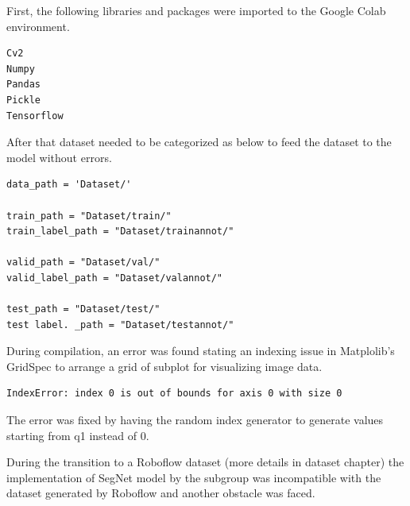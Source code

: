 First, the following libraries and packages were imported to the Google Colab environment.
\begin{lstlisting}
Cv2
Numpy
Pandas
Pickle
Tensorflow
\end{lstlisting}

After that dataset needed to be categorized as below to feed the dataset to the model without errors.
\begin{lstlisting}
data_path = 'Dataset/'

train_path = "Dataset/train/"
train_label_path = "Dataset/trainannot/"

valid_path = "Dataset/val/"
valid_label_path = "Dataset/valannot/"

test_path = "Dataset/test/"
test label. _path = "Dataset/testannot/"
\end{lstlisting}

During compilation, an error was found stating an indexing issue in Matplolib’s GridSpec to arrange a grid of subplot for visualizing image data.
\begin{lstlisting}
IndexError: index 0 is out of bounds for axis 0 with size 0
\end{lstlisting}

The error was fixed by having the random index generator to generate values starting from q1 instead of 0.


During the transition to a Roboflow dataset (more details in dataset chapter) the implementation of SegNet model by the subgroup was incompatible with the dataset generated by Roboflow and another obstacle was faced.




